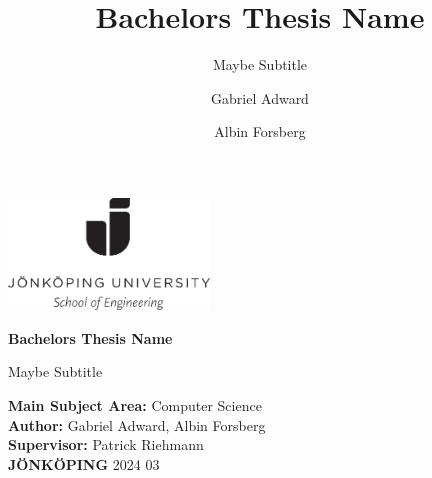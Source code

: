 \documentclass[11pt]{scrreprt}
\title{Bachelors Thesis Name}
\subtitle{Maybe Subtitle}
\author{Gabriel Adward \and Albin Forsberg}
\begin{document}
\begin{titlepage}
        \includegraphics[width=0.4\textwidth]{./Images/ju.png}
        \vspace{2cm}
        
        \Huge \Huge
        \textbf{Bachelors Thesis Name}
        
        \vspace{0.5cm}
        \LARGE
        Maybe Subtitle
        
        \vfill
        \small
        \noindent
        \textbf{Main Subject Area:} Computer Science \\
        \textbf{Author:} Gabriel Adward, Albin Forsberg \\
        \textbf{Supervisor:} Patrick Riehmann \\
        \textbf{JÖNKÖPING} 2024 03
\end{titlepage}

\begin{abstract}
    
\end{abstract}

\tableofcontents










\cite{greenwade93}



\end{document}
